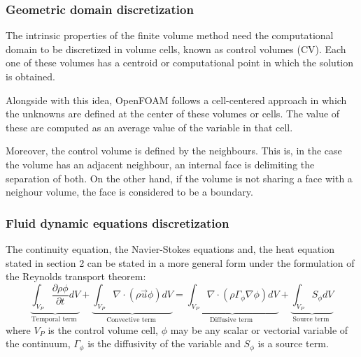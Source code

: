 \subsubsection*{Geometric domain discretization}

\setlength{\parindent}{0.5cm} The intrinsic properties of the finite volume method need the computational domain to be discretized in volume cells, known as control volumes (CV). Each one of these volumes has a centroid or computational point in which the solution is obtained. 

\noindent Alongside with this idea, OpenFOAM follows a cell-centered approach in which the unknowns are defined at the center of these volumes or cells. The value of these are computed as an average value of the variable in that cell.

\noindent Moreover, the control volume is defined by the neighbours. This is, in the case the volume has an adjacent neighbour, an internal face is delimiting the separation of both. On the other hand, if the volume is not sharing a face with a neighour volume, the face is considered to be a boundary.

\subsubsection*{Fluid dynamic equations discretization}

\setlength{\parindent}{0.5cm} The continuity equation, the Navier-Stokes equations and, the heat equation stated in section 2 can be stated in a more general form under the formulation of the Reynolds transport theorem:
\begin{equation}
	\underbrace{\int_{V_{P}} \frac{\partial \rho \phi}{\partial t} d V}_{\text {Temporal term }}+\underbrace{\int_{V_{P}} \nabla \cdot(\rho \vec{u} \phi) d V}_{\text {Convective term }}=\underbrace{\int_{V_{P}} \nabla \cdot\left(\rho \Gamma_{\phi} \nabla \phi\right) d V}_{\text {Diffusive term }}+\underbrace{\int_{V_{P}} S_{\phi} d V}_{\text {Source term }}
	\label{3.1}
\end{equation}
where $V_{P}$ is the control volume cell, $\phi$ may be any scalar or vectorial variable of the continuum, $\Gamma_{\phi}$ is the diffusivity of the variable and $S_{\phi}$ is a source term. 

